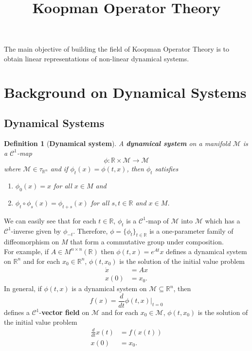 \documentclass[]{article}
\title{Koopman Operator Theory}
\author{}
\date{}
\newtheorem{definition}{Definition}
\begin{document}
\maketitle

The main objective of building the field of Koopman Operator Theory is to obtain linear representations of non-linear dynamical systems.

\section{Background on Dynamical Systems}
\subsection{Dynamical Systems}
\begin{definition}[\textbf{Dynamical system}]
A \textbf{dynamical system} on a manifold $\mathcal{M}$ is a $\mathcal{C}^1$-map 
\begin{equation}
	\phi: \mathbb{R} \times \mathcal{M} \to \mathcal{M}
\end{equation}
where $\mathcal{M} \in \tau_{\mathbb{R}^n}$ and if $\phi_t(x)=\phi(t,x)$, then $\phi_t$ satisfies
\begin{enumerate}
	\item $\phi_0(x)=x$ for all $x \in M$ and 
	\item $\phi_t \circ \phi_s (x) = \phi_{t+s}(x)$ for all $s,t \in \mathbb{R}$ and $x \in M$.
\end{enumerate}
\end{definition}
We can easily see that for each $t \in \mathbb{R}$, $\phi_t$ is a $\mathcal{C}^1$-map of $\mathcal{M}$ into $\mathcal{M}$ which has a $\mathcal{C}^1$-inverse given by $\phi_{-t}$. Therefore, $\phi = \{\phi_t\}_{t \in \mathbb{R}}$ is a one-parameter family of diffeomorphism on $M$ that form a commutative group under composition. \\
For example, if $A \in M^{n \times n}(\mathbb{R})$ then $\phi(t,x)=e^{At}x$ defines a dynamical system on $\mathbb{R}^n$ and for each $x_0 \in \mathbb{R}^n$, $\phi(t,x_0)$ is the solution of the initial value problem
\begin{equation}
	\begin{split}
		\dot{x} & = Ax \\
		x(0) & = x_0.
	\end{split}
\end{equation}
In general, if $\phi(t,x)$ is a dynamical system on $\mathcal{M} \subseteq \mathbb{R}^n$, then
\begin{equation}
	f(x)=\frac{d}{dt}\phi(t,x)\bigg|_{t=0}
\end{equation}
defines a $\mathcal{C}^1$-\textbf{vector field} on $\mathcal{M}$ and for each $x_0 \in \mathcal{M}$, $\phi(t,x_0)$ is the solution of the initial value problem
\begin{equation}
	\begin{split}
		\frac{d}{dt} x(t) & = f(x(t)) \\
		x(0) & = x_0.
	\end{split}
\end{equation}
\end{document}
